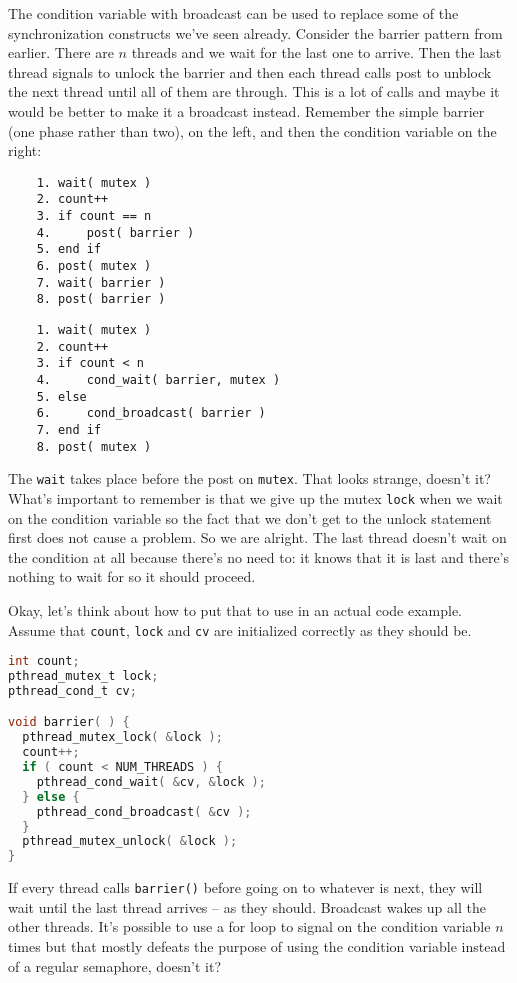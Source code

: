 The condition variable with broadcast can be used to replace some of the synchronization constructs we've seen already. Consider the barrier pattern from earlier. There are $n$ threads and we wait for the last one to arrive. Then the last thread signals to unlock the barrier and then each thread calls post to unblock the next thread until all of them are through. This is a lot of calls and maybe it would be better to make it a broadcast instead. Remember the simple barrier (one phase rather than two), on the left, and then the condition variable on the right:

\begin{multicols}{2}
	\begin{verbatim}
	1. wait( mutex )
	2. count++
	3. if count == n
	4.     post( barrier )
	5. end if
	6. post( mutex )
	7. wait( barrier )
	8. post( barrier )
  \end{verbatim}
	\columnbreak
	\begin{verbatim}
	1. wait( mutex )
	2. count++
	3. if count < n
	4.     cond_wait( barrier, mutex )
	5. else 
	6.     cond_broadcast( barrier )
	7. end if
	8. post( mutex )
  \end{verbatim}
\end{multicols}

The \texttt{wait} takes place before the post on \texttt{mutex}. That looks strange, doesn't it? What's important to remember is that we give up the mutex \texttt{lock} when we wait on the condition variable so the fact that we don't get to the unlock statement first does not cause a problem. So we are alright. The last thread doesn't wait on the condition at all because there's no need to: it knows that it is last and there's nothing to wait for so it should proceed.

Okay, let's think about how to put that to use in an actual code example. Assume that \texttt{count}, \texttt{lock} and \texttt{cv} are initialized correctly as they should be.

\begin{lstlisting}[language=C]
int count;
pthread_mutex_t lock;
pthread_cond_t cv; 

void barrier( ) {
  pthread_mutex_lock( &lock );
  count++;
  if ( count < NUM_THREADS ) {
    pthread_cond_wait( &cv, &lock );
  } else {
    pthread_cond_broadcast( &cv );
  }
  pthread_mutex_unlock( &lock );
}
\end{lstlisting}

If every thread calls \texttt{barrier()} before going on to whatever is next, they will wait until the last thread arrives -- as they should. Broadcast wakes up all the other threads. It's possible to use a for loop to signal on the condition variable $n$ times but that mostly defeats the purpose of using the condition variable instead of a regular semaphore, doesn't it?

